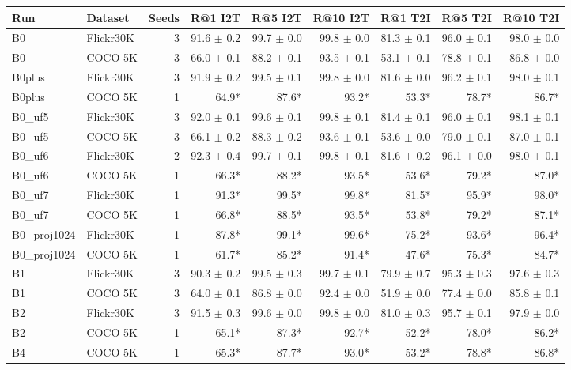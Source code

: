 \begin{tabular}{llrrrrrrr}
\toprule
Run & Dataset & Seeds & R@1 I2T & R@5 I2T & R@10 I2T & R@1 T2I & R@5 T2I & R@10 T2I \\
\midrule
B0 & Flickr30K & 3 & 91.6 $\pm$ 0.2 & 99.7 $\pm$ 0.0 & 99.8 $\pm$ 0.0 & 81.3 $\pm$ 0.1 & 96.0 $\pm$ 0.1 & 98.0 $\pm$ 0.0 \\
B0 & COCO 5K & 3 & 66.0 $\pm$ 0.1 & 88.2 $\pm$ 0.1 & 93.5 $\pm$ 0.1 & 53.1 $\pm$ 0.1 & 78.8 $\pm$ 0.1 & 86.8 $\pm$ 0.0 \\
B0plus & Flickr30K & 3 & 91.9 $\pm$ 0.2 & 99.5 $\pm$ 0.1 & 99.8 $\pm$ 0.0 & 81.6 $\pm$ 0.0 & 96.2 $\pm$ 0.1 & 98.0 $\pm$ 0.1 \\
B0plus & COCO 5K & 1 & 64.9* & 87.6* & 93.2* & 53.3* & 78.7* & 86.7* \\
B0\_uf5 & Flickr30K & 3 & 92.0 $\pm$ 0.1 & 99.6 $\pm$ 0.1 & 99.8 $\pm$ 0.1 & 81.4 $\pm$ 0.1 & 96.0 $\pm$ 0.1 & 98.1 $\pm$ 0.1 \\
B0\_uf5 & COCO 5K & 3 & 66.1 $\pm$ 0.2 & 88.3 $\pm$ 0.2 & 93.6 $\pm$ 0.1 & 53.6 $\pm$ 0.0 & 79.0 $\pm$ 0.1 & 87.0 $\pm$ 0.1 \\
B0\_uf6 & Flickr30K & 2 & 92.3 $\pm$ 0.4 & 99.7 $\pm$ 0.1 & 99.8 $\pm$ 0.1 & 81.6 $\pm$ 0.2 & 96.1 $\pm$ 0.0 & 98.0 $\pm$ 0.1 \\
B0\_uf6 & COCO 5K & 1 & 66.3* & 88.2* & 93.5* & 53.6* & 79.2* & 87.0* \\
B0\_uf7 & Flickr30K & 1 & 91.3* & 99.5* & 99.8* & 81.5* & 95.9* & 98.0* \\
B0\_uf7 & COCO 5K & 1 & 66.8* & 88.5* & 93.5* & 53.8* & 79.2* & 87.1* \\
B0\_proj1024 & Flickr30K & 1 & 87.8* & 99.1* & 99.6* & 75.2* & 93.6* & 96.4* \\
B0\_proj1024 & COCO 5K & 1 & 61.7* & 85.2* & 91.4* & 47.6* & 75.3* & 84.7* \\
B1 & Flickr30K & 3 & 90.3 $\pm$ 0.2 & 99.5 $\pm$ 0.3 & 99.7 $\pm$ 0.1 & 79.9 $\pm$ 0.7 & 95.3 $\pm$ 0.3 & 97.6 $\pm$ 0.3 \\
B1 & COCO 5K & 3 & 64.0 $\pm$ 0.1 & 86.8 $\pm$ 0.0 & 92.4 $\pm$ 0.0 & 51.9 $\pm$ 0.0 & 77.4 $\pm$ 0.0 & 85.8 $\pm$ 0.1 \\
B2 & Flickr30K & 3 & 91.5 $\pm$ 0.3 & 99.6 $\pm$ 0.0 & 99.8 $\pm$ 0.0 & 81.0 $\pm$ 0.3 & 95.7 $\pm$ 0.1 & 97.9 $\pm$ 0.0 \\
B2 & COCO 5K & 1 & 65.1* & 87.3* & 92.7* & 52.2* & 78.0* & 86.2* \\
B4 & COCO 5K & 1 & 65.3* & 87.7* & 93.0* & 53.2* & 78.8* & 86.8* \\

\end{tabular}
